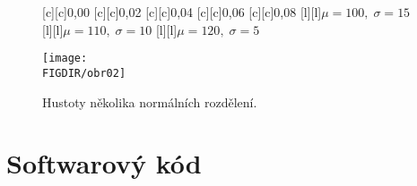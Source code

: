   
  \begin{figure}[ht]\centering
  \label{obr03:Nhust}

  [c][c]{\textsf{0{,}00}}  
  [c][c]{\textsf{0{,}02}}  
  [c][c]{\textsf{0{,}04}}
  [c][c]{\textsf{0{,}06}}  
  [c][c]{\textsf{0{,}08}}
  [l][l]{\textsf{\large $\mu = 100,\; \sigma = 15$}}
  [l][l]{\textsf{\large $\mu = 110,\; \sigma = 10$}}
  [l][l]{\textsf{\large $\mu = 120,\; \sigma = 5$}}
  
  \texttt{[image: \\FIGDIR/obr02]}
  
  \caption{Hustoty několika normálních rozdělení.}
  
  \end{figure}
  
  
  
  
  




\section{Softwarový kód}


